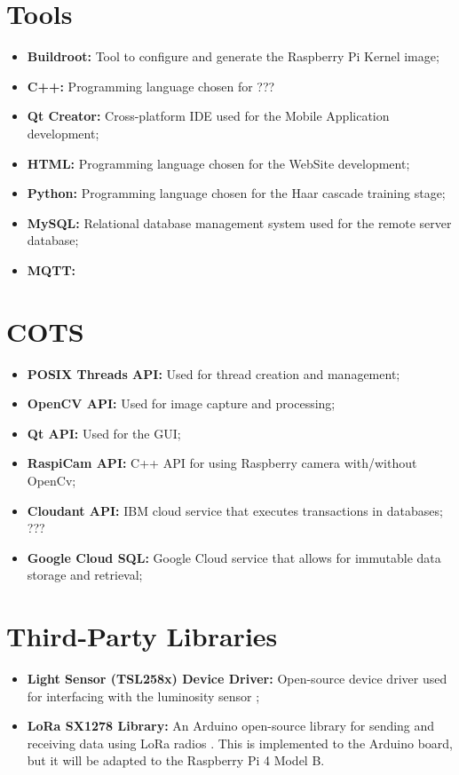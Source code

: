 \section{Tools}

\begin{itemize}
	\item \textbf{Buildroot:} Tool to configure and generate the Raspberry Pi Kernel image;
	\item \textbf{C++:} Programming language chosen for ???
	\item \textbf{Qt Creator:} Cross-platform IDE used for the Mobile Application development;
	\item \textbf{HTML:} Programming language chosen for the WebSite development;
	\item \textbf{Python:} Programming language chosen for the Haar cascade training stage;
	\item \textbf{MySQL:} Relational database management system used for the remote server database;
	\item \textbf{MQTT:}
\end{itemize}

\section{COTS}

\begin{itemize}
	\item \textbf{POSIX Threads API:} Used for thread creation and management;
	\item \textbf{OpenCV API:} Used for image capture and processing;
	\item \textbf{Qt API:} Used for the GUI;
	\item \textbf{RaspiCam API:} C++ API for using Raspberry camera with/without OpenCv;
	\item \textbf{Cloudant API:} IBM cloud service that executes transactions in databases; ???
	\item \textbf{Google Cloud SQL:} Google Cloud service that allows for immutable data storage and retrieval;
\end{itemize}

\section{Third-Party Libraries}

\begin{itemize}
	\item \textbf{Light Sensor (TSL258x) Device Driver:} Open-source device driver used for interfacing with the luminosity sensor \cite{code_tsl};
	\item \textbf{LoRa SX1278 Library:} An Arduino open-source library for sending and receiving data using LoRa radios \cite{sx1278_lib}. This is implemented to the Arduino board, but it will be adapted to the Raspberry Pi 4 Model B.
\end{itemize}
